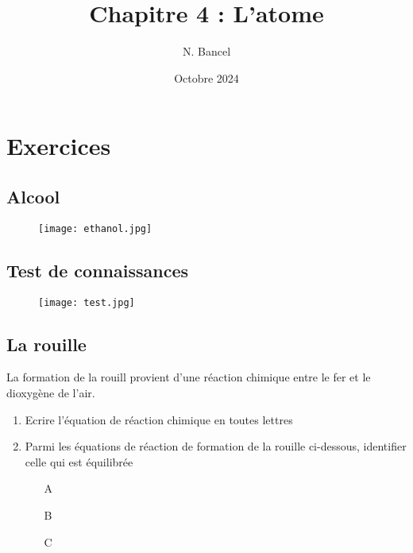 \documentclass[a4paper,12pt]{article}
\begin{document}
\title{Chapitre 4 : L'atome}
\author{N. Bancel}
\date{Octobre 2024}
\maketitle

\section{Exercices}

\subsection{Alcool}


\begin{figure}[H]
  \centering
  \texttt{[image: ethanol.jpg]}
\end{figure}

\subsection{Test de connaissances}


\begin{figure}[H]
  \centering
  \texttt{[image: test.jpg]}
\end{figure}

\subsection{La rouille}

La formation de la rouill provient d'une réaction chimique entre le fer et le dioxygène de l'air.

\begin{enumerate}

 \item Ecrire l'équation de réaction chimique en toutes lettres
 \item Parmi les équations de réaction de formation de la rouille ci-dessous, identifier celle qui est équilibrée 
 
 \begin{itemize}[noitemsep]
  \item[A] 
  \item[B] 
  \item[C] 
 \end{itemize}

\end{enumerate}
\end{document}
